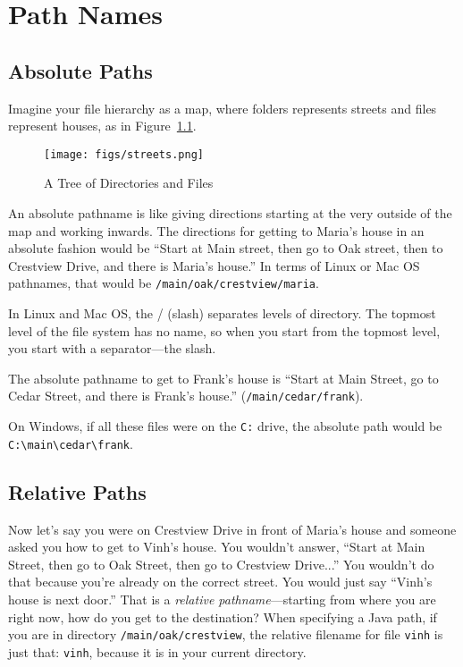 \chapter{Path Names}
\label{pathnames}

\section{Absolute Paths}

Imagine your file hierarchy as a map, where folders represents streets and files represent houses, as in Figure~\ref{fig.files}.

\begin{figure}[!ht]
\begin{center}
\texttt{[image: figs/streets.png]}
\caption{A Tree of Directories and Files}
\label{fig.files}
\end{center}
\end{figure}

An absolute pathname is like giving directions starting at the very outside of the map and working inwards. The directions for getting to Maria's house in an absolute fashion would be ``Start at Main street, then go to Oak street, then to Crestview Drive, and there is Maria's house.'' In terms of Linux or Mac OS pathnames, that would be \texttt{/main/oak/crestview/maria}.

In Linux and Mac OS, the / (slash) separates levels of directory. The topmost level of the file system has no name, so when you start from the topmost level, you start with a separator---the slash.

The absolute pathname to get to Frank's house is ``Start at Main Street, go to Cedar Street, and there is Frank's house.'' (\texttt{/main/cedar/frank}).

On Windows, if all these files were on the \texttt{C:} drive, the absolute path would be \texttt{C:\textbackslash main\textbackslash cedar\textbackslash frank}.

\section{Relative Paths}

Now let's say you were on Crestview Drive in front of Maria's house and someone asked you how to get to Vinh's house. You wouldn't answer, ``Start at Main Street, then go to Oak Street, then go to Crestview Drive...'' You wouldn't do that because you're already on the correct street. You would just say ``Vinh's house is next door.'' That is a {\em relative pathname}---starting from where you are right now, how do you get to the destination? When specifying a Java path, if you are in directory \texttt{/main/oak/crestview}, the relative filename for file \texttt{vinh} is just that: \texttt{vinh}, because it is in your current directory.

